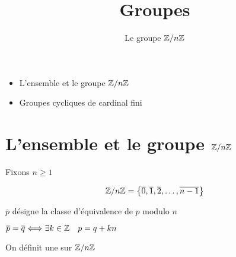 


\newcommand{\GL}{\mathcal{G}\ell}









\title{{\bf Groupes}}
\subtitle{Le groupe $\mathbb{Z}/n\mathbb{Z}$}

\begin{frame}
  
  \debutmontitre

  \pause

{\footnotesize
\hfill
{}
\begin{minipage}{0.6\textwidth}
  \begin{itemize}
    \item<3-> L'ensemble et le groupe $\mathbb{Z}/n\mathbb{Z}$
    \item<4-> Groupes cycliques de cardinal fini
  \end{itemize}
\end{minipage}
}

\end{frame}

\setcounter{framenumber}{0}





\section{L'ensemble et le groupe $\mathbb{Z}/n\mathbb{Z}$}

\begin{frame}
Fixons $n \ge 1$

$$\mathbb{Z}/n\mathbb{Z} =\left\{ \overline{0}, \overline{1}, \overline{2},\ldots, \overline{n-1} \right\}$$

\pause


$\overline p$ désigne la classe d'équivalence de $p$ modulo $n$


\pause

\centerline{$\overline p = \overline q \Longleftrightarrow \exists k \in \mathbb{Z} \quad p = q + kn$}


\pause
\bigskip

On définit une  sur $\mathbb{Z}/n\mathbb{Z}$



\end{frame}

